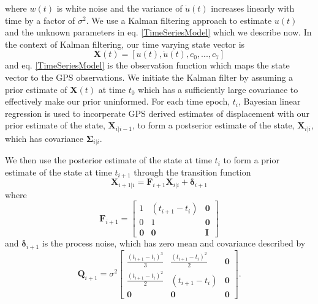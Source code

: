 \documentclass[12pt]{article}
\begin{document}
where $w(t)$ is white noise and the variance of $\dot{u}(t)$ increases linearly with time by a factor of $\sigma^2$. We use a
Kalman filtering approach to estimate $u(t)$ and the unknown parameters in eq. \ref{TimeSeriesModel} which we describe now.  In the context of Kalman filtering, our time varying state vector is
\begin{equation}
    \mathbf{X}(t) = [u(t),\dot u(t), c_0, ..., c_7]
\end{equation}
and eq. \ref{TimeSeriesModel} is the observation function which maps the state vector to the GPS observations. We initiate the Kalman filter by assuming a prior estimate of $\mathbf{X}(t)$ at time $t_0$ which has a sufficiently large covariance to effectively make our prior uninformed.  For each time epoch, $t_i$, Bayesian linear regression is used to incorperate GPS derived estimates of displacement with our prior estimate of the state, $\mathbf{X}_{i|i-1}$, to form a postserior estimate of the state, $\mathbf{X}_{i|i}$, which has covariance $\mathbf{\Sigma}_{i|i}$.  

We then use the posterior estimate of the state at time $t_i$ to form a prior estimate of the state at time $t_{i+1}$ through the transition function
\begin{equation}\label{predict}
  \mathbf{X}_{i+1|i} = \mathbf{F}_{i+1}\mathbf{X}_{i|i} + \mathbf{\delta}_{i+1} 
\end{equation}
where 
\begin{equation}
  \mathbf{F}_{i+1} = 
  \left[
  \begin{array}{ccc}
    1           & (t_{i+1} - t_i) & \mathbf{0}\\
    0           & 1              & \mathbf{0}\\
    \mathbf{0}  & \mathbf{0}     & \mathbf{I}
  \end{array}
  \right]
\end{equation}
and $\mathbf{\delta}_{i+1}$ is the process noise, which has zero mean and covariance described by
\begin{equation}
  \mathbf{Q}_{i+1} = 
  \sigma^2 \left[
  \begin{array}{ccc}
  \frac{(t_{i+1} - t_i)^3}{3} & \frac{(t_{i+1} - t_{i})^2}{2} & \mathbf{0}\\
  \frac{(t_{i+1} - t_i)^2}{2} & (t_{i+1} - t_{i}) & \mathbf{0}\\ 
  \mathbf{0} & \mathbf{0} & \mathbf{0}
  \end{array}
  \right].
\end{equation}
\end{document}
